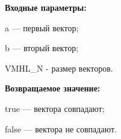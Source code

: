 \textbf{Входные параметры:}

  a --- первый вектор;
  
 b --- вторый вектор;
 
 VMHL\_N - размер векторов.

\textbf{Возвращаемое значение:}

 true --- вектора совпадают;
 
 false --- вектора не совпадают.